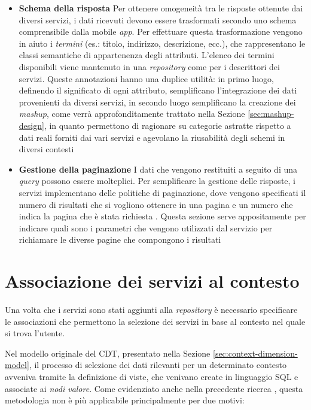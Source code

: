 \begin{itemize}
\begin{enumerate}
	\end{enumerate}
	\item \textbf{Schema della risposta}
	Per ottenere omogeneità tra le risposte ottenute dai diversi servizi, i dati ricevuti devono essere trasformati secondo uno schema comprensibile dalla mobile \emph{app}. Per effettuare questa trasformazione vengono in aiuto i \emph{termini} (es.: titolo, indirizzo, descrizione, ecc.), che rappresentano le classi semantiche di appartenenza degli attributi. L'elenco dei termini disponibili viene mantenuto in una \emph{repository} come per i descrittori dei servizi. Queste annotazioni hanno una duplice utilità: in primo luogo, definendo il significato di ogni attributo, semplificano l'integrazione dei dati provenienti da diversi servizi, in secondo luogo semplificano la creazione dei \emph{mashup}, come verrà approfonditamente trattato nella Sezione \ref{sec:mashup-design}, in quanto permettono di ragionare su categorie astratte rispetto a dati reali forniti dai vari servizi e agevolano la riusabilità degli schemi in diversi contesti 
	\item \textbf{Gestione della paginazione}
	I dati che vengono restituiti a seguito di una \emph{query} possono essere molteplici. Per semplificare la gestione delle risposte, i servizi implementano delle politiche di paginazione, dove vengono specificati il numero di risultati che si vogliono ottenere in una pagina e un numero che indica la pagina che è stata richiesta \cite{masse2011rest}. Questa sezione serve appositamente per indicare quali sono i parametri che vengono utilizzati dal servizio per richiamare le diverse pagine che compongono i risultati
\end{itemize}

\section{Associazione dei servizi al contesto\label{sec:associazione-servizi-cdt}}

Una volta che i servizi sono stati aggiunti alla \emph{repository} è necessario specificare le associazioni che permettono la selezione dei servizi in base al contesto nel quale si trova l'utente.

Nel modello originale del CDT, presentato nella Sezione \ref{sec:context-dimension-model}, il processo di selezione dei dati rilevanti per un determinato contesto avveniva tramite la definizione di viste, che venivano create in linguaggio SQL e associate ai \emph{nodi valore}. Come evidenziato anche nella precedente ricerca \cite{rizzo2015progettazione}, questa metodologia non è più applicabile principalmente per due motivi:

